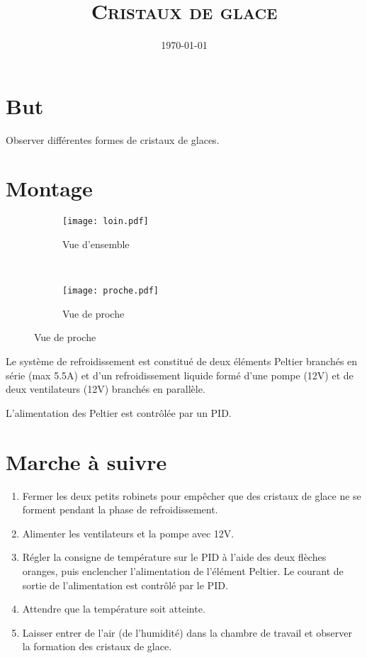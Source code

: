 \documentclass[a4paper,french]{article}
\begin{document}
\title{\textsc{Cristaux de glace}}
\date{\today}
\maketitle

\section*{But}
	Observer différentes formes de cristaux de glaces.

\section*{Montage}
	\begin{figure}[h]
		\centering
		\begin{subfigure}[b]{0.54\textwidth}
		\centering
		\texttt{[image: loin.pdf]}
		\caption{Vue d'ensemble}
		\end{subfigure}
	~
		\begin{subfigure}[b]{0.43\textwidth}
		\centering
		\texttt{[image: proche.pdf]}
		\caption{Vue de proche}
		\end{subfigure}
	\end{figure}
	
	Le système de refroidissement est constitué de deux éléments Peltier branchés en série (max 5.5A) et d'un refroidissement liquide formé d'une pompe (12V) et de deux ventilateurs (12V) branchés en parallèle.
	
	L'alimentation des Peltier est contrôlée par un PID.

\section*{Marche à suivre}
	\begin{enumerate}
		\item Fermer les deux petits robinets pour empêcher que des cristaux de glace ne se forment pendant la phase de refroidissement.
		\item Alimenter les ventilateurs et la pompe avec 12V.
		\item Régler la consigne de température sur le PID à l'aide des deux flèches oranges, puis enclencher l'alimentation de l'élément Peltier. Le courant de sortie de l'alimentation est contrôlé par le PID. 
		\item Attendre que la température soit atteinte.
		\item Laisser entrer de l'air (de l'humidité) dans la chambre de travail et observer la formation des cristaux de glace.
	\end{enumerate}
\end{document}
